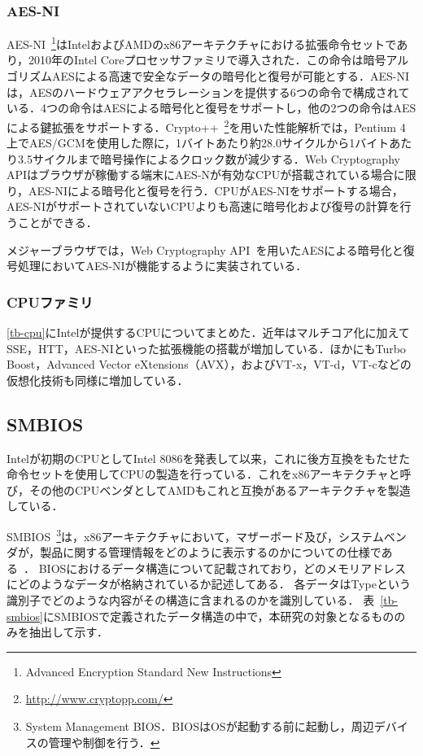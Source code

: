 \subsubsection{AES-NI}
AES-NI~\footnote{Advanced Encryption Standard New Instructions}はIntelおよびAMDのx86アーキテクチャにおける拡張命令セットであり，2010年のIntel Coreプロセッサファミリで導入された．この命令は暗号アルゴリズムAESによる高速で安全なデータの暗号化と復号が可能とする．AES-NIは，AESのハードウェアアクセラレーションを提供する6つの命令で構成されている．4つの命令はAESによる暗号化と復号をサポートし，他の2つの命令はAESによる鍵拡張をサポートする．Crypto++~\footnote{\url{http://www.cryptopp.com/}}を用いた性能解析では，Pentium 4上でAES/GCMを使用した際に，1バイトあたり約28.0サイクルから1バイトあたり3.5サイクルまで暗号操作によるクロック数が減少する．Web Cryptography APIはブラウザが稼働する端末にAES-Nが有効なCPUが搭載されている場合に限り，AES-NIによる暗号化と復号を行う．CPUがAES-NIをサポートする場合，AES-NIがサポートされていないCPUよりも高速に暗号化および復号の計算を行うことができる．

メジャーブラウザでは，Web Cryptography API~\cite{web_crypto}を用いたAESによる暗号化と復号処理においてAES-NIが機能するように実装されている．
\subsubsection{CPUファミリ}
\ref{tb-cpu}にIntelが提供するCPUについてまとめた．近年はマルチコア化に加えてSSE，HTT，AES-NIといった拡張機能の搭載が増加している．ほかにもTurbo Boost，Advanced Vector eXtensions（AVX），およびVT-x，VT-d，VT-cなどの仮想化技術も同様に増加している．
\subsection{SMBIOS}
Intelが初期のCPUとしてIntel 8086を発表して以来，これに後方互換をもたせた命令セットを使用してCPUの製造を行っている．これをx86アーキテクチャと呼び，その他のCPUベンダとしてAMDもこれと互換があるアーキテクチャを製造している．

SMBIOS~\footnote{System Management BIOS．BIOSはOSが起動する前に起動し，周辺デバイスの管理や制御を行う．}は，x86アーキテクチャにおいて，マザーボード及び，システムベンダが，製品に関する管理情報をどのように表示するのかについての仕様である~\cite{smbios_spec}．
BIOSにおけるデータ構造について記載されており，どのメモリアドレスにどのようなデータが格納されているか記述してある．
各データはTypeという識別子でどのような内容がその構造に含まれるのかを識別している．
表~\ref{tb-smbios}にSMBIOSで定義されたデータ構造の中で，本研究の対象となるもののみを抽出して示す．



